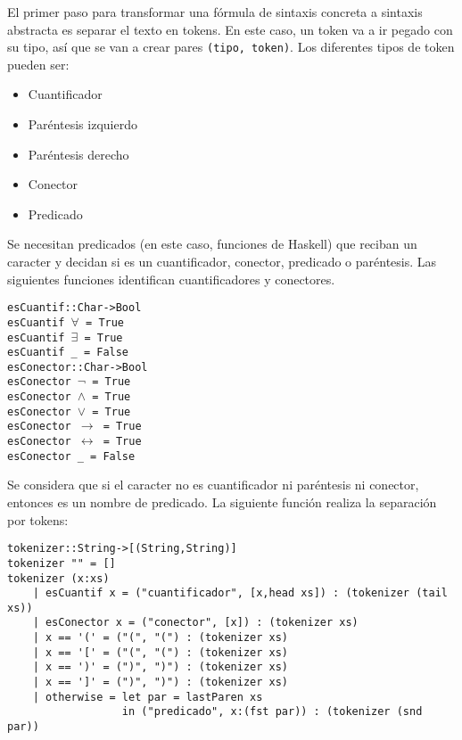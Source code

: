\documentclass{article}
\begin{document}
El primer paso para transformar una fórmula de sintaxis concreta a sintaxis abstracta es separar el texto en tokens. En este caso, un token va a ir pegado con su tipo, así que se van a crear pares \texttt{(tipo, token)}. Los diferentes tipos de token pueden ser:

\begin{itemize}
\item Cuantificador
\item Paréntesis izquierdo
\item Paréntesis derecho
\item Conector
\item Predicado
\end{itemize}

Se necesitan predicados (en este caso, funciones de Haskell) que reciban un caracter y decidan si es un cuantificador, conector, predicado o paréntesis. Las siguientes funciones identifican cuantificadores y conectores.

\texttt{esCuantif::Char->Bool}\\
\texttt{esCuantif $\forall$ = True}\\
\texttt{esCuantif $\exists$ = True}\\
\texttt{esCuantif \_ = False}\\

\texttt{esConector::Char->Bool}\\
\texttt{esConector $\lnot$ = True}\\
\texttt{esConector $\land$ = True}\\
\texttt{esConector $\lor$ = True}\\
\texttt{esConector $\rightarrow$ = True}\\
\texttt{esConector $\leftrightarrow$ = True}\\
\texttt{esConector \_ = False}

Se considera que si el caracter no es cuantificador ni paréntesis ni conector, entonces es un nombre de predicado. La siguiente función realiza la separación por tokens:

\begin{verbatim}
tokenizer::String->[(String,String)]
tokenizer "" = []
tokenizer (x:xs)
    | esCuantif x = ("cuantificador", [x,head xs]) : (tokenizer (tail xs))
    | esConector x = ("conector", [x]) : (tokenizer xs)
    | x == '(' = ("(", "(") : (tokenizer xs)
    | x == '[' = ("(", "(") : (tokenizer xs)
    | x == ')' = (")", ")") : (tokenizer xs)
    | x == ']' = (")", ")") : (tokenizer xs)
    | otherwise = let par = lastParen xs
                  in ("predicado", x:(fst par)) : (tokenizer (snd par))
\end{verbatim}
\end{document}
